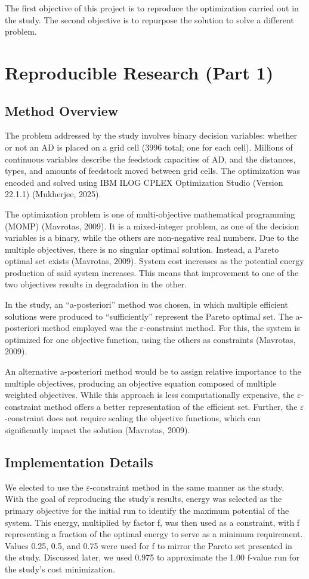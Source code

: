 \documentclass[12pt]{article}
\begin{document}
The first objective of this project is to reproduce the optimization carried out in the study. The second objective is to repurpose the solution to solve a different problem. 


\section{Reproducible Research (Part 1)}
\subsection{Method Overview}
The problem addressed by the study involves binary decision variables: whether or not an AD is placed on a grid cell (3996 total; one for each cell). Millions of continuous variables describe the feedstock capacities of AD, and the distances, types, and amounts of feedstock moved between grid cells. The optimization was encoded and solved using IBM ILOG CPLEX Optimization Studio (Version 22.1.1) (Mukherjee, 2025).

The optimization problem is  one of multi-objective mathematical programming (MOMP) (Mavrotas, 2009). It is a mixed-integer problem, as one of the decision variables is a binary, while the others are non-negative real numbers. Due to the multiple objectives, there is no singular optimal solution. Instead, a Pareto optimal set exists (Mavrotas, 2009). System cost increases as the potential energy production of said system increases. This means that improvement to one of the two objectives results in degradation in the other. 

In the study, an “a-posteriori” method was chosen, in which multiple efficient solutions were produced to “sufficiently” represent the Pareto optimal set. The a-posteriori method employed was the $\varepsilon$-constraint method. For this, the system is optimized for one objective function, using the others as constraints (Mavrotas, 2009).

An alternative a-posteriori method would be to assign relative importance to the multiple objectives, producing an objective equation composed of multiple weighted objectives. While this approach is less computationally expensive, the $\varepsilon$-constraint method offers a better representation of the efficient set. Further, the $\varepsilon$-constraint does not require scaling the objective functions, which can significantly impact the solution (Mavrotas, 2009).

\subsection{Implementation Details}
We elected to use the $\varepsilon$-constraint method in the same manner as the study. With the goal of reproducing the study's results, energy was selected as the primary objective for the initial run to identify the maximum potential of the system. This energy, multiplied by factor f, was then used as a constraint, with f representing a fraction of the optimal energy to serve as a minimum requirement. Values 0.25, 0.5, and 0.75 were used for f to mirror the Pareto set presented in the study. Discussed later, we used 0.975 to approximate the 1.00 f-value run for the study's cost minimization. 
 
\end{document}
